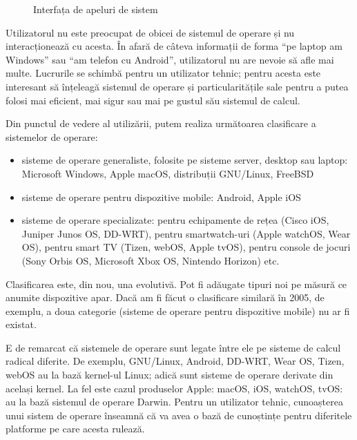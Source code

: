 \begin{figure}[htbp]
  \centering
  \def\svgwidth{\columnwidth}
  
  \caption{Interfața de apeluri de sistem}
  \label{fig:intro:syscall-interface}
\end{figure}

Utilizatorul nu este preocupat de obicei de sistemul de operare și nu interacționează cu acesta. În afară de câteva informații de forma “pe laptop am Windows” sau “am telefon cu Android”, utilizatorul nu are nevoie să afle mai multe. Lucrurile se schimbă pentru un utilizator tehnic; pentru acesta este interesant să înțeleagă sistemul de operare și particularitățile sale pentru a putea folosi mai eficient, mai sigur sau mai pe gustul său sistemul de calcul.

Din punctul de vedere al utilizării, putem realiza următoarea clasificare a sistemelor de operare:

\begin{itemize}
  \item sisteme de operare generaliste, folosite pe sisteme server, desktop sau laptop: Microsoft Windows, Apple macOS, distribuții GNU/Linux, FreeBSD
  \item sisteme de operare pentru dispozitive mobile: Android, Apple iOS
  \item sisteme de operare specializate: pentru echipamente de rețea (Cisco iOS, Juniper Junos OS, DD-WRT), pentru smartwatch-uri (Apple watchOS, Wear OS), pentru smart TV (Tizen, webOS, Apple tvOS), pentru console de jocuri (Sony Orbis OS, Microsoft Xbox OS, Nintendo Horizon) etc.
\end{itemize}

Clasificarea este, din nou, una evolutivă. Pot fi adăugate tipuri noi pe măsură ce anumite dispozitive apar. Dacă am fi făcut o clasificare similară în 2005, de exemplu, a doua categorie (sisteme de operare pentru dispozitive mobile) nu ar fi existat.

E de remarcat că sistemele de operare sunt legate între ele pe sisteme de calcul radical diferite. De exemplu, GNU/Linux, Android, DD-WRT, Wear OS, Tizen, webOS au la bază kernel-ul Linux; adică sunt sisteme de operare derivate din același kernel. La fel este cazul produselor Apple: macOS, iOS, watchOS, tvOS: au la bază sistemul de operare Darwin. Pentru un utilizator tehnic, cunoașterea unui sistem de operare înseamnă că va avea o bază de cunoștințe pentru diferitele platforme pe care acesta rulează.

